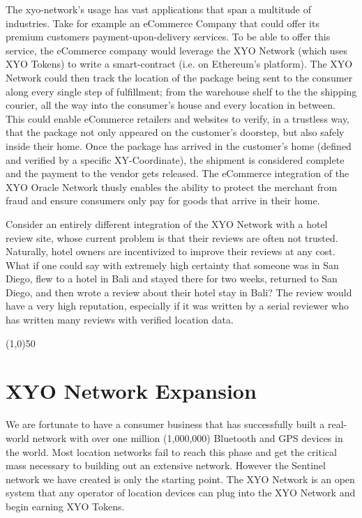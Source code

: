 \documentclass{article}
\begin{document}
The \Gls{xyo-network}'s usage  has vast applications that span a multitude of industries. Take for example an eCommerce Company that could offer its premium customers payment-upon-delivery services. To be able to offer this service, the eCommerce company would leverage the XYO Network (which uses XYO Tokens) to write a \gls{smart-contract} (i.e. on Ethereum's platform). The XYO Network could then track the location of the package being sent to the consumer along every single step of fulfillment; from the warehouse shelf to the the shipping courier, all the way into the consumer's house and every location in between. This could enable eCommerce retailers and websites to verify, in a trustless way, that the package not only appeared on the customer's doorstep, but also safely inside their home. Once the package has arrived in the customer's home (defined and verified by a specific XY-Coordinate), the shipment is considered complete and the payment to the vendor gets released. The eCommerce integration of the XYO Oracle Network thusly enables the ability to protect the merchant from fraud and ensure consumers only pay for goods that arrive in their home.


Consider an entirely different integration of the XYO Network with a hotel review site, whose current problem is that their reviews are often not trusted. Naturally, hotel owners are incentivized to improve their reviews at any cost. What if one could say with extremely high \gls{certainty} that someone was in San Diego, flew to a hotel in Bali and stayed there for two weeks, returned to San Diego, and then wrote a review about their hotel stay in Bali? The review would have a very high reputation, especially if it was written by a serial reviewer who has written many reviews with verified location data.

\begin{center}
\line(1,0){50}
\end{center}

\section {XYO Network Expansion}
We are fortunate to have a consumer business that has successfully built a real-world network with over one million (1,000,000) Bluetooth and GPS devices in the world. Most location networks fail to reach this phase and get the critical mass necessary to building out an extensive network. However the Sentinel network we have created is only the starting point. The XYO Network is an open system that any operator of location devices can plug into the XYO Network and begin earning XYO Tokens.
\end{document}
